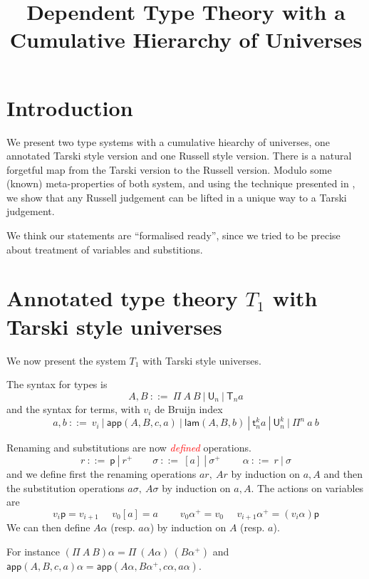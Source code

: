 \documentclass[11pt,a4paper]{article}
\theoremstyle{definition}
\def\UU{\mathsf{U}}
\newcommand{\LAM}{\mathsf{lam}}
\newcommand{\APP}{\mathsf{app}}
\newcommand{\T}{\mathsf{T}}
\newcommand{\sT}{\mathsf{t}}
\newcommand{\pp}{\mathsf{p}}
\newcommand{\EMP}[1]{\emph{\textcolor{red}{#1}}}
\begin{document}
\title{Dependent Type Theory with a Cumulative Hierarchy of Universes}

\author{}
\date{}
\maketitle

\begin{abstract}
\end{abstract}

\section{Introduction}\label{sec:intros}

  We present two type systems with a cumulative hiearchy of universes, one annotated Tarski style version and
  one Russell style version. There is a natural forgetful map from the Tarski version to the Russell version. Modulo some (known)
  meta-properties of both system, and using the technique presented in \cite{Streicher:semtt},
  we show that any Russell judgement can be lifted in a unique way to a Tarski judgement.

  We think our statements are ``formalised ready'', since we tried to be precise about treatment of variables and substitions.


\section{Annotated type theory $T_1$ with Tarski style universes}

We now present the system $T_1$ with Tarski style universes. 

The syntax for types is
$$
A,B~::=~\Pi~{A}~B~|~\UU_n~|~\T_n a
$$
and the syntax for terms, with $v_i$ de Bruijn index
$$
a,b~::=~v_i~|~\APP(A,B,c,a)~|~\LAM(A,B,b)~|~\sT^k_n a~|~\UU^k_n~|~\Pi^n~a~b
$$

\medskip

Renaming and substitutions are now \EMP{defined} operations. 
$$
r~::=~\pp~|~r^+~~~~~~~~~\sigma~::=~[a]~|~\sigma^+~~~~~~~~~~\alpha~::=~r~|~\sigma
$$
and we define first the renaming operations $ar,~Ar$ by induction on $a,A$ and then the substitution operations
$a\sigma,~A\sigma$ by induction on $a,A$. The actions on variables are
$$
v_i\pp = v_{i+1}~~~~~~v_0[a] = a~~~~~~~~~~v_0\alpha^+ = v_0~~~~~~v_{i+1}\alpha^+ = (v_i\alpha)\pp
$$
We can then define $A\alpha$ (resp. $a\alpha$) by induction on $A$ (resp. $a$).

For instance $(\Pi~A~B)\alpha = \Pi~(A\alpha)~(B\alpha^+)$
and $\APP(A,B,c,a)\alpha = \APP(A\alpha,B\alpha^+,c\alpha,a\alpha)$.
\end{document}
